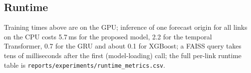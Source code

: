 \subsection{Runtime}
Training times above are on the GPU; inference of one forecast origin for all links on the CPU costs 5.7\,ms for the
proposed model, 2.2 for the temporal Transformer, 0.7 for the GRU and about 0.1 for XGBoost; a FAISS query takes
tens of milliseconds after the first (model-loading) call; the full per-link runtime table is
\texttt{reports/experiments/runtime\_metrics.csv}.
